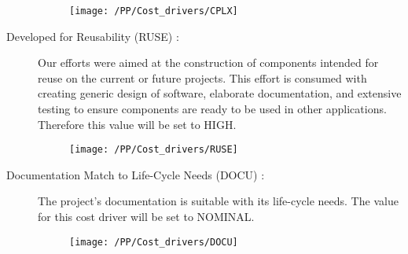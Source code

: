 \begin{description}
    \newpage
    \begin{figure}[!ht]
      \centering
      \vspace{0.1cm}
      \texttt{[image: /PP/Cost\_drivers/CPLX]}\\
      \vspace{0.1cm}
      \label{fig:CPLX} 
    \end{figure}
    \item [Developed for Reusability (RUSE) :] Our efforts were aimed at the construction of components intended for reuse on the current or future projects. This effort is consumed with creating generic design of software, elaborate documentation, and extensive testing to ensure components are ready to be used in other applications. Therefore this value will be set to HIGH.
	   \begin{figure}[!ht]
      \centering
      \vspace{0.2cm}
      \texttt{[image: /PP/Cost\_drivers/RUSE]}\\
      \vspace{0.2cm}
      \label{fig:RUSE} 
    \end{figure}
    \item [Documentation Match to Life-Cycle Needs (DOCU) :] The project's documentation is suitable with its life-cycle needs. The value for this cost driver will be set to NOMINAL.
    \begin{figure}[!ht]
      \centering
      \vspace{0.2cm}
      \texttt{[image: /PP/Cost\_drivers/DOCU]}\\
      \vspace{0.2cm}
      \label{fig:DOCU} 
    \end{figure}
\end{description}


